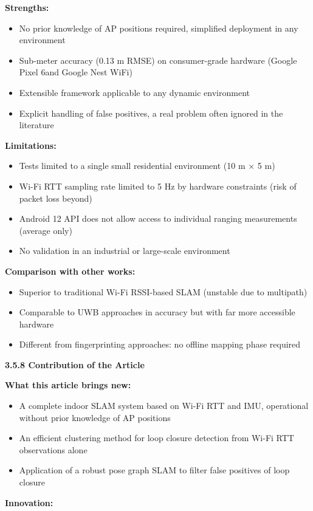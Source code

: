 \documentclass{ipgpmaster}
\begin{document}
\textbf{Strengths:}

\begin{itemize}
    \item No prior knowledge of AP positions required,  simplified deployment in any environment
    \item Sub-meter accuracy (0.13 m RMSE) on consumer-grade hardware (Google Pixel 6and  Google Nest WiFi)
    \item Extensible framework applicable to any dynamic environment
    \item Explicit handling of false positives, a real problem often ignored in the literature
\end{itemize}
\textbf{Limitations:}

\begin{itemize}
    \item Tests limited to a single small residential environment (10 m × 5 m)
    \item Wi-Fi RTT sampling rate limited to 5 Hz by hardware constraints (risk of packet loss beyond)
    \item Android 12 API does not allow access to individual ranging measurements (average only)
    \item No validation in an industrial or large-scale environment
\end{itemize}
\textbf{Comparison with other works:}

\begin{itemize}
    \item Superior to traditional Wi-Fi RSSI-based SLAM (unstable due to multipath)
    \item Comparable to UWB approaches in accuracy but with far more accessible hardware
    \item Different from fingerprinting approaches: no offline mapping phase required


\end{itemize}
 \textbf{3.5.8   Contribution of the Article}

\textbf{What this article brings new:}

\begin{itemize}
    \item A complete indoor SLAM system based on Wi-Fi RTT and IMU, operational without prior knowledge of AP positions
    \item An efficient clustering method for loop closure detection from Wi-Fi RTT observations alone
    \item Application of a robust pose graph SLAM to filter false positives of loop closure
\end{itemize}
\textbf{Innovation:}
\end{document}
